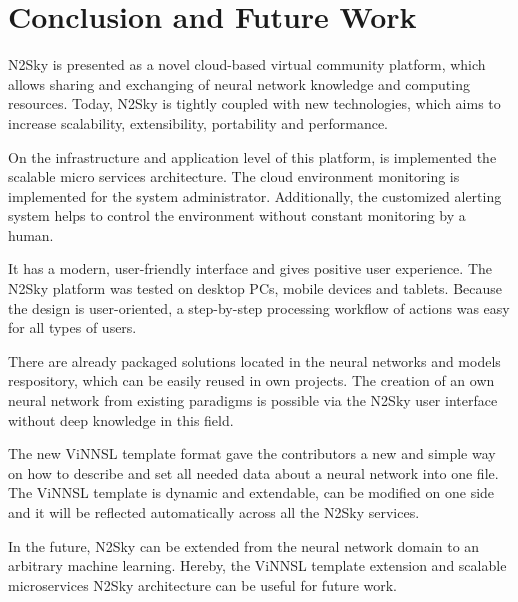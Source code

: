 \newpage

\section{Conclusion and Future Work}\label{Conclusion and Future Work}

N2Sky is presented as a novel cloud-based virtual community platform, which allows sharing and exchanging of neural network knowledge and computing resources. Today, N2Sky is tightly coupled with new technologies, which aims to increase scalability, extensibility, portability and performance.

On the infrastructure and application level of this platform, is implemented the scalable micro services architecture. The cloud environment monitoring is implemented for the system administrator. Additionally, the customized alerting system helps to control the environment without constant monitoring by a human.  

It has a modern, user-friendly interface and gives positive user experience. The N2Sky platform was tested on desktop PCs, mobile devices and tablets. Because the design is user-oriented, a step-by-step processing workflow of actions was easy for all types of users. 

There are already packaged solutions located in the neural networks and models respository, which can be easily reused in own projects. The creation of an own neural network from existing paradigms is possible via the N2Sky user interface without deep knowledge in this field.

The new ViNNSL template format gave the contributors a new and simple way on how to describe and set all needed data about a neural network into one file. The ViNNSL template is dynamic and extendable, can be modified on one side and it will be reflected automatically across all the N2Sky services. 

In the future, N2Sky can be extended from the neural network domain to an arbitrary machine learning. Hereby, the ViNNSL template extension and scalable microservices N2Sky architecture can be useful for future work.